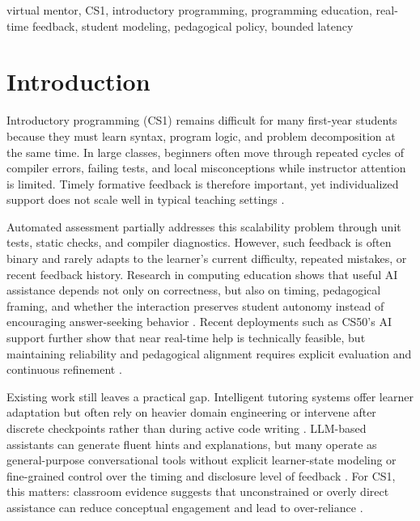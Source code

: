 ﻿\documentclass[conference]{IEEEtran}
\begin{document}
\begin{IEEEkeywords}
virtual mentor, CS1, introductory programming, programming education, real-time feedback, student modeling, pedagogical policy, bounded latency
\end{IEEEkeywords}

\section{Introduction}

Introductory programming (CS1) remains difficult for many first-year students because they must learn syntax, program logic, and problem decomposition at the same time. In large classes, beginners often move through repeated cycles of compiler errors, failing tests, and local misconceptions while instructor attention is limited. Timely formative feedback is therefore important, yet individualized support does not scale well in typical teaching settings \cite{DesirableCharacteristicsforAITeachingAssistantsinProgrammingEducation,FeasibilityStudyofAugmentingTeachingAssistantswithAI}.

Automated assessment partially addresses this scalability problem through unit tests, static checks, and compiler diagnostics. However, such feedback is often binary and rarely adapts to the learner's current difficulty, repeated mistakes, or recent feedback history. Research in computing education shows that useful AI assistance depends not only on correctness, but also on timing, pedagogical framing, and whether the interaction preserves student autonomy instead of encouraging answer-seeking behavior \cite{SystematicLiteratureReviewonLLM,PatternsofLLMPoweredProgrammingAssistant,DesirableCharacteristicsforAITeachingAssistantsinProgrammingEducation}. Recent deployments such as CS50's AI support further show that near real-time help is technically feasible, but maintaining reliability and pedagogical alignment requires explicit evaluation and continuous refinement \cite{ImprovingAIinCS50}.

Existing work still leaves a practical gap. Intelligent tutoring systems offer learner adaptation but often rely on heavier domain engineering or intervene after discrete checkpoints rather than during active code writing \cite{ProgTutor,Francisco2022}. LLM-based assistants can generate fluent hints and explanations, but many operate as general-purpose conversational tools without explicit learner-state modeling or fine-grained control over the timing and disclosure level of feedback \cite{CodeAid,IRIS,TheProgrammersAssistant}. For CS1, this matters: classroom evidence suggests that unconstrained or overly direct assistance can reduce conceptual engagement and lead to over-reliance \cite{PatternsofLLMPoweredProgrammingAssistant,FeasibilityStudyofAugmentingTeachingAssistantswithAI}.
\end{document}
